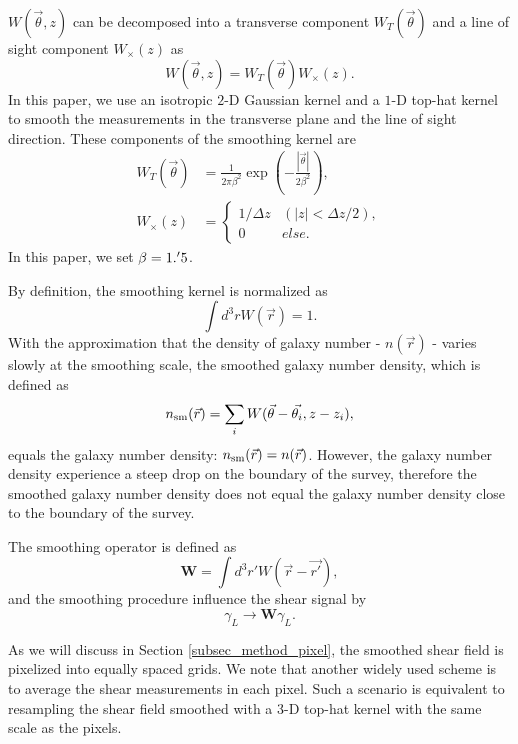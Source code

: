\documentclass[twocolumn]{aastex63}
\begin{document}
$W(\vec{\theta},z)$ can be decomposed into a transverse component
$W_T(\vec{\theta})$ and a line of sight component
$W_\times(z)$ as
\begin{equation}
W(\vec{\theta},z)=W_T(\vec{\theta}) W_\times (z).
\end{equation}
In this paper, we use an isotropic $2$-D Gaussian kernel and a $1$-D top-hat
kernel to smooth the measurements in the transverse plane and the line of sight
direction. These components of the smoothing kernel are
\begin{equation}
\begin{split}
W_T(\vec{\theta}) &=\frac{1}{2\pi\beta^2}\exp(-\frac{|\vec{\theta}|}{2\beta^2}),\\
W_\times (z) &=
\begin{cases}
1/\Delta z& (|z|<\Delta z/2),\\
0& else.
\end{cases}
\end{split}
\end{equation}
In this paper, we set $\beta=1.\mbox{$^\prime$}5$.

By definition, the smoothing kernel is normalized as
\begin{equation}
\int d^3r W(\vec{r})=1.
\end{equation}
With the approximation that the density of galaxy number - $n(\vec{r})$ -
varies slowly at the smoothing scale, the smoothed galaxy number density,
which is defined as
\begin{equation}\label{eq-numDesSmooth}
n_{\rm{sm}}(\vec{r})=\sum_i W(\vec{\theta}-\vec{\theta_i},z-z_i),
\end{equation}
equals the galaxy number density: $n_{\rm{sm}}(\vec{r})=n(\vec{r})$.
However, the galaxy number density experience a steep drop on the boundary
of the survey, therefore the smoothed galaxy number density does not equal the
galaxy number density close to the boundary of the survey.

The smoothing operator is defined as
\begin{equation}
\mathbf{W} = \int d^3 r' W(\vec{r}-\vec{r'}),
\end{equation}
and the smoothing procedure influence the shear signal by
\begin{equation}
\gamma_L \rightarrow \mathbf{W} \gamma_L.
\end{equation}

As we will discuss in Section \ref{subsec_method_pixel}, the smoothed shear
field is pixelized into equally spaced grids. We note that another widely used
scheme is to average the shear measurements in each pixel.  Such a scenario is
equivalent to resampling the shear field smoothed with a $3$-D top-hat kernel
with the same scale as the pixels.
\end{document}
